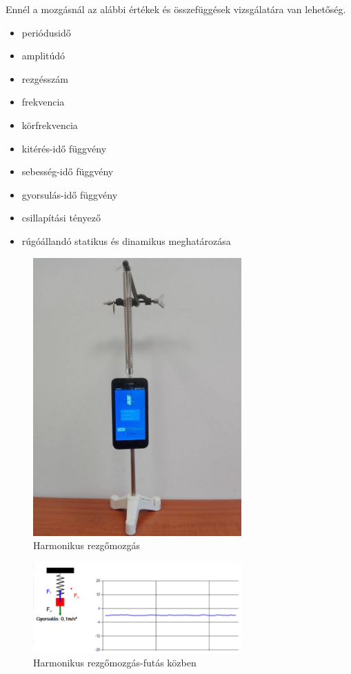 \documentclass{thesis-ekf}
\theoremstyle{definition}
\theoremstyle{remark}
\begin{document}
Ennél a mozgásnál az alábbi értékek és összefüggések vizsgálatára van lehetőség.

\begin{itemize}
	\item periódusidő
	\item amplitúdó
	\item rezgésszám
	\item frekvencia
	\item körfrekvencia
	\item kitérés-idő függvény
	\item sebesség-idő függvény
	\item gyorsulás-idő függvény
	\item csillapítási tényező
	\item rúgóállandó statikus és dinamikus meghatározása
\end{itemize}

\begin{figure}[!h]
		\centering
		\includegraphics[width=8cm]{harmon}
		\caption{Harmonikus rezgőmozgás}\label{EVEGYM3}
	\end{figure}
	\begin{figure}[!h]
		\centering
		\includegraphics[width=8cm]{harmonikus}
		\caption{Harmonikus rezgőmozgás-futás közben}\label{inga1}
	\end{figure}
\pagebreak	
	
\end{document}
